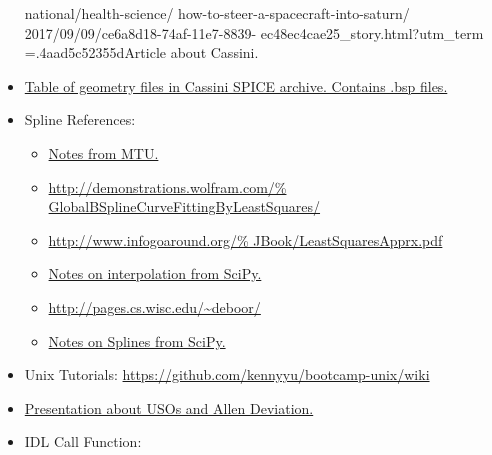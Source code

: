 \documentclass[crop=false,class=article,oneside]{standalone}
\begin{document}
\begin{itemize}[itemsep=0pt]
{                            national/health-science/%
                            how-to-steer-a-spacecraft-into-saturn/%
                            2017/09/09/ce6a8d18-74af-11e7-8839-%
                            ec48ec4cae25_story.html?utm_term%
                            =.4aad5c52355d}{Article about Cassini.}
                \item \href{https://naif.jpl.nasa.gov/pub/%
                            naif/pds/data/co-s_j_e_v-spice-6-v1.0/%
                            cosp_1000/data/pck/pckinfo.txt}
                           {Table of geometry files in Cassini
                            SPICE archive. Contains .bsp files.}
                \item Spline References:
                \begin{itemize}
                    \item \href{http://www.cs.mtu.edu/%
                                ~shene/COURSES/cs3621/NOTES/%
                                INT-APP/CURVE-APP-global.html}
                               {Notes from MTU.}
                    \item \url{http://demonstrations.wolfram.com/%
                               GlobalBSplineCurveFittingByLeastSquares/}
                    \item \url{http://www.infogoaround.org/%
                               JBook/LeastSquaresApprx.pdf}
                    \item \href{https://docs.scipy.org/doc/%
                                scipy-0.15.1/reference/generated/%
                                scipy.interpolate.splrep.html}
                               {Notes on interpolation from SciPy.}
                    \item \url{http://pages.cs.wisc.edu/~deboor/}
                    \item \href{https://docs.scipy.org/doc/%
                                scipy/reference/generated/%
                                scipy.interpolate.splrep.html}
                               {Notes on Splines from SciPy.}
                \end{itemize}
                \item Unix Tutorials:
                    \url{https://github.com/kennyyu/bootcamp-unix/wiki}
                \item \href{https://websites.isae-supaero.fr/%
                            IMG/pdf/uso-toulouse.pdf}
                           {Presentation about USOs and Allen Deviation.}
                \item IDL Call Function:

\end{itemize}
\end{document}
